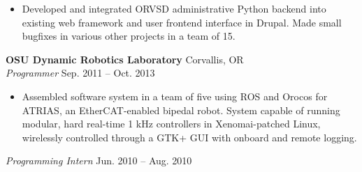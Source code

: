 \documentclass[10pt,letterpaper,margin]{res}
\begin{document}
\begin{resume}
\begin{itemize}
	\item Developed and integrated ORVSD administrative Python backend into
		existing web framework and user frontend interface in Drupal. Made
		small bugfixes in various other projects in a team of 15.
\end{itemize}


{\bf OSU Dynamic Robotics Laboratory} \hfill {\color{lightgray} Corvallis, OR} \\
{\it Programmer} \hfill {\color{lightgray} Sep. 2011 -- Oct. 2013}\vspace{0.2em}

\begin{itemize}
	\item Assembled software system in a team of five using ROS and Orocos for
		ATRIAS, an EtherCAT-enabled bipedal robot. System capable of running
		modular, hard real-time 1 kHz controllers in Xenomai-patched Linux,
		wirelessly controlled through a GTK+ GUI with onboard and remote
		logging.


\end{itemize}

{\it Programming Intern} \hfill {\color{lightgray} Jun. 2010 -- Aug. 2010}\vspace{0.2em}


\end{resume}
\end{document}
